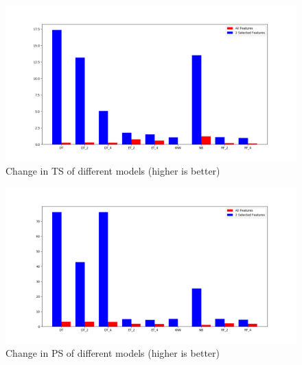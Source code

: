 \begin{figure}[h]
    \hfill\includegraphics[width=1\textwidth]{Chapter4/ts_improvement}\hspace*{\fill}
    \caption{Change in TS of different models (higher is better)}
    \label{ts_improvement}
\end{figure}

\begin{figure}[h]
    \hfill\includegraphics[width=1\textwidth]{Chapter4/ps_improvement}\hspace*{\fill}
    \caption{Change in PS of different models (higher is better)}
    \label{ps_improvement}
\end{figure}
